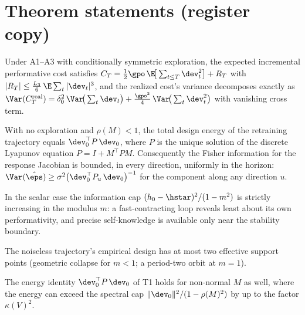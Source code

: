 \documentclass[11pt]{article}
\begin{document}
\section*{Theorem statements (register copy)}


\begin{lemma}
Under A1--A3 with conditionally symmetric exploration, the expected
incremental performative cost satisfies
$C_T = \tfrac{1}{2}\gpo\,\E\!\big[\sum_{t\le T}\dev_t^2\big] + R_T$ with
$|R_T| \le \tfrac{L_3}{6}\,\E\sum_t |\dev_t|^3$, and the realized cost's
variance decomposes exactly as
$\Var(C_T^{\mathrm{real}}) = \delta_0^2\,\Var\!\big(\sum_t \dev_t\big)
+ \tfrac{\gpo^2}{4}\,\Var\!\big(\sum_t \dev_t^2\big)$
with vanishing cross term.
\end{lemma}

\begin{theorem}
With no exploration and $\rho(M)<1$, the total design energy of the
retraining trajectory equals $\dev_0^\top P\,\dev_0$, where $P$ is the
unique solution of the discrete Lyapunov equation $P = I + M^\top P M$.
Consequently the Fisher information for the response Jacobian is bounded,
in every direction, uniformly in the horizon:
$\Var(\hat\eps) \ge \sigma^2\big(\dev_0^\top P_u\,\dev_0\big)^{-1}$ for the
component along any direction $u$.
\end{theorem}

\begin{corollary}
In the scalar case the information cap $(h_0-\hstar)^2/(1-m^2)$ is strictly
increasing in the modulus $m$: a fast-contracting loop reveals least about
its own performativity, and precise self-knowledge is available only near
the stability boundary.
\end{corollary}

\begin{corollary}
The noiseless trajectory's empirical design has at most two effective
support points (geometric collapse for $m<1$; a period-two orbit at
$m=1$).
\end{corollary}

\begin{remark}
The energy identity $\dev_0^\top P\,\dev_0$ of T1 holds for non-normal $M$
as well, where the energy can exceed the spectral cap
$\|\dev_0\|^2/(1-\rho(M)^2)$ by up to the factor $\kappa(V)^2$.
\end{remark}
\end{document}
